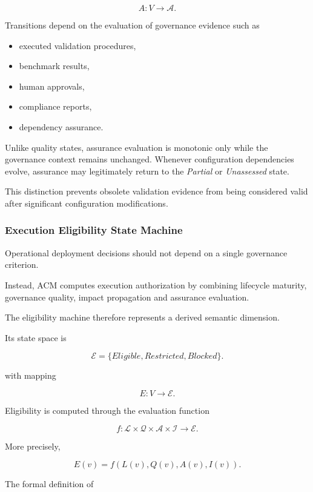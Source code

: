 \documentclass[10pt]{article}
\begin{document}
\[
A
:
V
\rightarrow
\mathcal{A}.
\]

Transitions depend on the evaluation of governance evidence such as

\begin{itemize}
    \item executed validation procedures,
    \item benchmark results,
    \item human approvals,
    \item compliance reports,
    \item dependency assurance.
\end{itemize}

Unlike quality states, assurance evaluation is monotonic only while the
governance context remains unchanged.
Whenever configuration dependencies evolve, assurance may legitimately return
to the \emph{Partial} or \emph{Unassessed} state.

This distinction prevents obsolete validation evidence from being considered
valid after significant configuration modifications.

\subsubsection{Execution Eligibility State Machine}

Operational deployment decisions should not depend on a single governance
criterion.

Instead, ACM computes execution authorization by combining lifecycle maturity,
governance quality, impact propagation and assurance evaluation.

The eligibility machine therefore represents a derived semantic dimension.

Its state space is

\[
\mathcal{E}
=
\{
Eligible,
Restricted,
Blocked
\}.
\]

with mapping

\[
E
:
V
\rightarrow
\mathcal{E}.
\]

Eligibility is computed through the evaluation function

\[
f
:
\mathcal{L}
\times
\mathcal{Q}
\times
\mathcal{A}
\times
\mathcal{I}
\rightarrow
\mathcal{E}.
\]

More precisely,

\[
E(v)
=
f
(
L(v),
Q(v),
A(v),
I(v)
).
\]

The formal definition of
\end{document}
